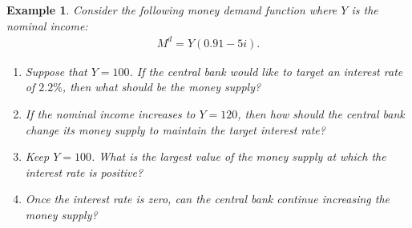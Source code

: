 \documentclass[12pt]{article}
\newtheorem{example}{Example}
\begin{document}
\begin{example}
	Consider the following money demand function where $Y$ is the nominal income:
	\begin{align*}
		M^d = Y (0.91-5i).
	\end{align*}
	
	\begin{enumerate}[label=(\alph*)]
		\item Suppose that $Y=100$. If the central bank would like to target an interest rate of $2.2\%$, then what should be the money supply?
		\vspace{36pt}
		\item If the nominal income increases to $Y=120$, then how should the central bank change its money supply to maintain the target interest rate?
		\vspace{36pt}
		\item Keep $Y=100$. What is the largest value of the money supply at which the interest rate is positive?
		\vspace{36pt}
		\item Once the interest rate is zero, can the central bank continue increasing the money supply?
	\end{enumerate}
\end{example}
\end{document}
